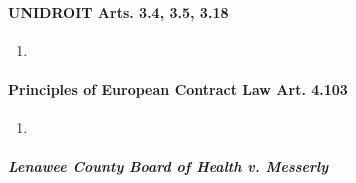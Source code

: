 \paragraph{UNIDROIT Arts. 3.4, 3.5, 3.18}

\begin{enumerate}
    \item %
\end{enumerate}

\paragraph{Principles of European Contract Law Art. 4.103}

\begin{enumerate}
    \item %
\end{enumerate}

\paragraph{\emph{Lenawee County Board of Health v. Messerly}}

